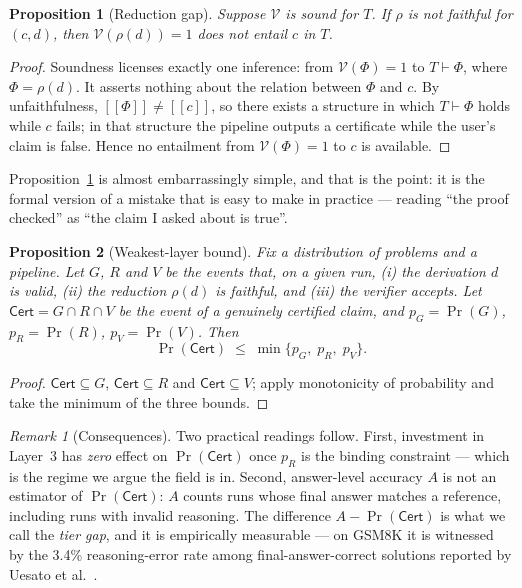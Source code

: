 \documentclass[11pt,a4paper]{article}
\theoremstyle{plain}
\newtheorem{proposition}{Proposition}
\theoremstyle{remark}
\newtheorem{remark}{Remark}
\newcommand{\red}{\rho}                 %
\newcommand{\cert}{\mathsf{Cert}}       %
\newcommand{\sem}[1]{\ensuremath{[\![#1]\!]}}   %
\begin{document}
\begin{proposition}[Reduction gap]
\label{prop:gap}
Suppose $\mathcal{V}$ is sound for $T$.  If $\red$ is not faithful for
$(c,d)$, then $\mathcal{V}(\red(d))=1$ does \emph{not} entail $c$ in $T$.
\end{proposition}

\begin{proof}
Soundness licenses exactly one inference: from $\mathcal{V}(\Phi)=1$ to
$T\vdash\Phi$, where $\Phi=\red(d)$.  It asserts nothing about the relation
between $\Phi$ and $c$.  By unfaithfulness, $\sem{\Phi}\neq\sem{c}$, so there
exists a structure in which $T\vdash\Phi$ holds while $c$ fails; in that
structure the pipeline outputs a certificate while the user's claim is false.
Hence no entailment from $\mathcal{V}(\Phi)=1$ to $c$ is available.
\end{proof}

Proposition~\ref{prop:gap} is almost embarrassingly simple, and that is the
point: it is the formal version of a mistake that is easy to make in practice
--- reading ``the proof checked'' as ``the claim I asked about is true''.

\begin{proposition}[Weakest-layer bound]
\label{prop:bound}
Fix a distribution of problems and a pipeline.  Let $G$, $R$ and $V$ be the
events that, on a given run, (i) the derivation $d$ is valid, (ii) the
reduction $\red(d)$ is faithful, and (iii) the verifier accepts.  Let
$\cert=G\cap R\cap V$ be the event of a genuinely certified claim, and
$p_G=\Pr(G)$, $p_R=\Pr(R)$, $p_V=\Pr(V)$.  Then
\[
  \Pr(\cert)\;\leq\;\min\{p_G,\;p_R,\;p_V\}.
\]
\end{proposition}

\begin{proof}
$\cert\subseteq G$, $\cert\subseteq R$ and $\cert\subseteq V$; apply monotonicity
of probability and take the minimum of the three bounds.
\end{proof}

\begin{remark}[Consequences]
Two practical readings follow.  First, investment in Layer~3 has \emph{zero}
effect on $\Pr(\cert)$ once $p_R$ is the binding constraint --- which is the
regime we argue the field is in.  Second, answer-level accuracy $A$ is not an
estimator of $\Pr(\cert)$: $A$ counts runs whose final answer matches a
reference, including runs with invalid reasoning.  The difference
$A-\Pr(\cert)$ is what we call the \emph{tier gap}, and it is empirically
measurable --- on GSM8K it is witnessed by the 3.4\% reasoning-error rate among
final-answer-correct solutions reported by Uesato et al.\
\cite{uesato2022process}.
\end{remark}
\end{document}

